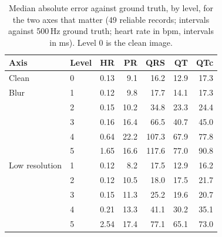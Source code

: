 \begin{table}[ht]
\centering\small
\caption{Median absolute error against ground truth, by level, for the two axes that matter (49 reliable records; intervals against 500\,Hz ground truth; heart rate in bpm, intervals in ms). Level 0 is the clean image.}\label{tab:intervals}
\begin{tabular}{@{}llrrrrr@{}}
\toprule
Axis & Level & HR & PR & QRS & QT & QTc \\
\midrule
Clean & 0 & 0.13 & 9.1 & 16.2 & 12.9 & 17.3 \\
\midrule
Blur & 1 & 0.12 & 9.8 & 17.7 & 14.1 & 17.3 \\
 & 2 & 0.15 & 10.2 & 34.8 & 23.3 & 24.4 \\
 & 3 & 0.16 & 16.4 & 66.5 & 40.7 & 45.0 \\
 & 4 & 0.64 & 22.2 & 107.3 & 67.9 & 77.8 \\
 & 5 & 1.65 & 16.6 & 117.6 & 77.0 & 90.8 \\
\midrule
Low resolution & 1 & 0.12 & 8.2 & 17.5 & 12.9 & 16.2 \\
 & 2 & 0.12 & 10.5 & 18.0 & 17.5 & 21.7 \\
 & 3 & 0.15 & 11.3 & 25.2 & 19.6 & 20.7 \\
 & 4 & 0.21 & 13.3 & 41.1 & 30.2 & 35.1 \\
 & 5 & 2.54 & 17.4 & 77.1 & 65.1 & 73.0 \\
\bottomrule
\end{tabular}
\end{table}